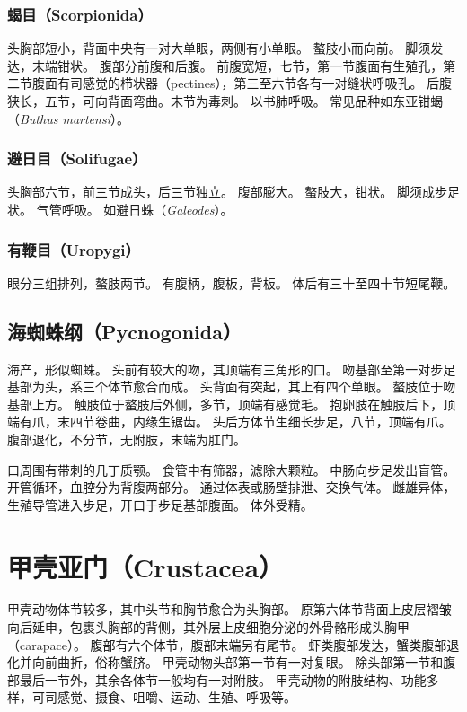 \documentclass[11pt]{article}
\begin{document}
\subsubsection{蝎目（Scorpionida）}
头胸部短小，背面中央有一对大单眼，两侧有小单眼。
螯肢小而向前。
脚须发达，末端钳状。
腹部分前腹和后腹。
前腹宽短，七节，第一节腹面有生殖孔，第二节腹面有司感觉的栉状器（pectines），第三至六节各有一对缝状呼吸孔。
后腹狭长，五节，可向背面弯曲。末节为毒刺。
以书肺呼吸。
常见品种如东亚钳蝎（\textit{Buthus martensi}）。

\subsubsection{避日目（Solifugae）}
头胸部六节，前三节成头，后三节独立。
腹部膨大。
螯肢大，钳状。
脚须成步足状。
气管呼吸。
如避日蛛（\textit{Galeodes}）。

\subsubsection{有鞭目（Uropygi）}
眼分三组排列，螯肢两节。
有腹柄，腹板，背板。
体后有三十至四十节短尾鞭。

\subsection{海蜘蛛纲（Pycnogonida）}
海产，形似蜘蛛。
头前有较大的吻，其顶端有三角形的口。
吻基部至第一对步足基部为头，系三个体节愈合而成。
头背面有突起，其上有四个单眼。
螯肢位于吻基部上方。
触肢位于螯肢后外侧，多节，顶端有感觉毛。
抱卵肢在触肢后下，顶端有爪，末四节卷曲，内缘生锯齿。
头后方体节生细长步足，八节，顶端有爪。
腹部退化，不分节，无附肢，末端为肛门。

\newline

口周围有带刺的几丁质颚。
食管中有筛器，滤除大颗粒。
中肠向步足发出盲管。
开管循环，血腔分为背腹两部分。
通过体表或肠壁排泄、交换气体。
雌雄异体，生殖导管进入步足，开口于步足基部腹面。
体外受精。

\section{甲壳亚门（Crustacea）}
甲壳动物体节较多，其中头节和胸节愈合为头胸部。
原第六体节背面上皮层褶皱向后延申，包裹头胸部的背侧，其外层上皮细胞分泌的外骨骼形成头胸甲（carapace）。
腹部有六个体节，腹部末端另有尾节。
虾类腹部发达，蟹类腹部退化并向前曲折，俗称蟹脐。
甲壳动物头部第一节有一对复眼。
除头部第一节和腹部最后一节外，其余各体节一般均有一对附肢。
甲壳动物的附肢结构、功能多样，可司感觉、摄食、咀嚼、运动、生殖、呼吸等。
\end{document}
